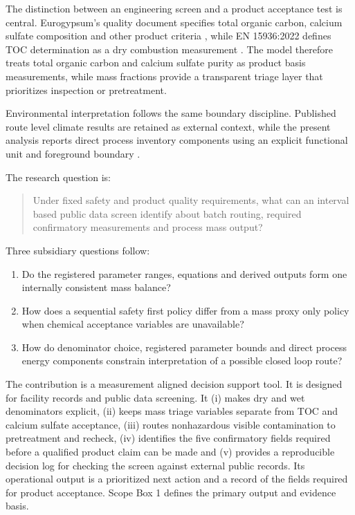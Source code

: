 \documentclass[pdflatex,sn-basic]{sn-jnl}
\begin{document}
The distinction between an engineering screen and a product acceptance test is central. Eurogypsum's quality document specifies total organic carbon, calcium sulfate composition and other product criteria \citep{eurogypsum2024}, while EN 15936:2022 defines TOC determination as a dry combustion measurement \citep{en15936_2022}. The model therefore treats total organic carbon and calcium sulfate purity as product basis measurements, while mass fractions provide a transparent triage layer that prioritizes inspection or pretreatment.

Environmental interpretation follows the same boundary discipline. Published route level climate results are retained as external context, while the present analysis reports direct process inventory components using an explicit functional unit and foreground boundary \citep{cristobal2024,iso14040,iso14044}.

The research question is:

\begin{quote}
Under fixed safety and product quality requirements, what can an interval based public data screen identify about batch routing, required confirmatory measurements and process mass output?
\end{quote}

Three subsidiary questions follow:

\begin{enumerate}


\item
  Do the registered parameter ranges, equations and derived outputs form one internally consistent mass balance?
\item
  How does a sequential safety first policy differ from a mass proxy only policy when chemical acceptance variables are unavailable?
\item
  How do denominator choice, registered parameter bounds and direct process energy components constrain interpretation of a possible closed loop route?
\end{enumerate}

The contribution is a measurement aligned decision support tool. It is designed for facility records and public data screening. It (i) makes dry and wet denominators explicit, (ii) keeps mass triage variables separate from TOC and calcium sulfate acceptance, (iii) routes nonhazardous visible contamination to pretreatment and recheck, (iv) identifies the five confirmatory fields required before a qualified product claim can be made and (v) provides a reproducible decision log for checking the screen against external public records. Its operational output is a prioritized next action and a record of the fields required for product acceptance. Scope Box 1 defines the primary output and evidence basis.
\end{document}

